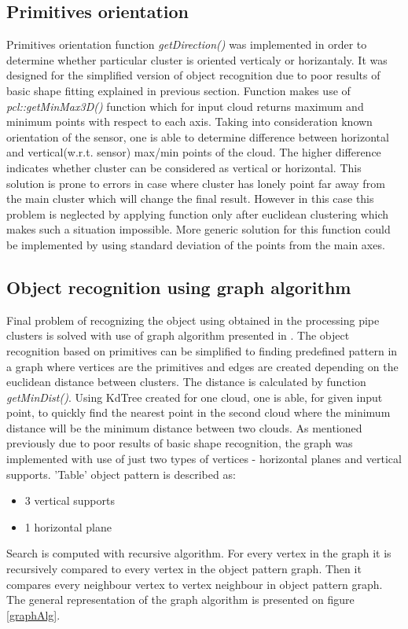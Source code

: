 \documentclass[12pt,oneside]{amsart}
\begin{document}
\subsection{Primitives orientation}
Primitives orientation function \emph{getDirection()} was implemented in order to determine whether particular cluster is oriented verticaly or horizantaly. It was designed for the simplified version of object recognition due to poor results of basic shape fitting explained in previous section.\newline
\indent Function makes use of \emph{pcl::getMinMax3D()} function which for input cloud returns maximum and minimum points with respect to each axis. Taking into consideration known orientation of the sensor, one is able to determine difference between horizontal and vertical(w.r.t. sensor) max/min points of the cloud. The higher difference indicates whether cluster can be considered as vertical or horizontal. This solution is prone to errors in case where cluster has lonely point far away from the main cluster which will change the final result. However in this case this problem is neglected by applying function only after euclidean clustering which makes such a situation impossible. More generic solution for this function could be implemented by using standard deviation of the points from the main axes.

\subsection{Object recognition using graph algorithm}
Final problem of recognizing the object using obtained in the processing pipe clusters is solved with use of graph algorithm presented in \cite{graph}. The object recognition based on primitives can be simplified to finding predefined pattern in a graph where vertices are the primitives and edges are created depending on the euclidean distance between clusters. \newline
\indent The distance is calculated by function \emph{getMinDist()}. Using KdTree created for one cloud, one is able, for given input point, to quickly find the nearest point in the second cloud where the minimum distance will be the minimum distance between two clouds.\newline
\indent As mentioned previously due to poor results of basic shape recognition, the graph was implemented with use of just two types of vertices - horizontal planes and vertical supports. 'Table' object pattern is described as:
\begin{itemize}
  \item 3 vertical supports
  \item 1 horizontal plane
\end{itemize}
Search is computed with recursive algorithm. For every vertex in the graph it is recursively compared to every vertex in the object pattern graph. 
Then it compares every neighbour vertex to vertex neighbour in object pattern graph. The general representation of the graph algorithm is presented on figure \ref{graphAlg}.
\end{document}
